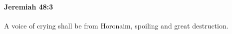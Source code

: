 
		\paragraph{Jeremiah 48:3} %
			\label{JEREMIAH-48-3}

			A voice of crying shall be from Horonaim, spoiling and great destruction.


